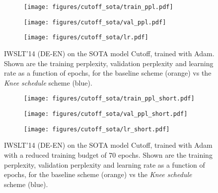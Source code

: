 \documentclass[twoside,11pt]{article}
\newcommand{\lrschedule}{\textit{Knee schedule}}
\begin{document}
\begin{figure}[h]
    \begin{subfigure}[t]{\textwidth}
        \centering
        \texttt{[image: figures/cutoff\_sota/train\_ppl.pdf]}
\label{fig:cutoff_adam_tr_ppl}
    \end{subfigure}
    \begin{subfigure}[t]{\textwidth}
        \centering
        \texttt{[image: figures/cutoff\_sota/val\_ppl.pdf]}
\label{fig:cutoff_adam_val_ppl}
    \end{subfigure}
    \begin{subfigure}[t]{\textwidth}
        \centering
        \texttt{[image: figures/cutoff\_sota/lr.pdf]}
\label{fig:cutoff_adam_lr}
    \end{subfigure}
\caption{IWSLT'14 (DE-EN) on the SOTA model   Cutoff\citep{shen2020simple}, trained with Adam. Shown are the training perplexity, validation perplexity and learning rate as a function of epochs, for the baseline scheme (orange) vs the \lrschedule{} scheme (blue).}
\label{fig:Cutoff_adam_result}
\end{figure}


\begin{figure}[h]
    \begin{subfigure}[t]{\textwidth}
        \centering
        \texttt{[image: figures/cutoff\_sota/train\_ppl\_short.pdf]}
\label{fig:cutoff_short_adam_tr_ppl}
    \end{subfigure}
    \begin{subfigure}[t]{\textwidth}
        \centering
        \texttt{[image: figures/cutoff\_sota/val\_ppl\_short.pdf]}
\label{fig:cutoff_short_adam_val_ppl}
    \end{subfigure}
    \begin{subfigure}[t]{\textwidth}
        \centering
        \texttt{[image: figures/cutoff\_sota/lr\_short.pdf]}
\label{fig:cutoff_short_adam_lr}
    \end{subfigure}
\caption{IWSLT'14 (DE-EN) on the SOTA model Cutoff\citep{shen2020simple}, trained with Adam with a reduced training budget of 70 epochs. Shown are the training perplexity, validation perplexity and learning rate as a function of epochs, for the baseline scheme (orange) vs the \lrschedule{} scheme (blue).}
\label{fig:Cutoff_short_adam_result}
\end{figure}

\iffalse
\end{document}
